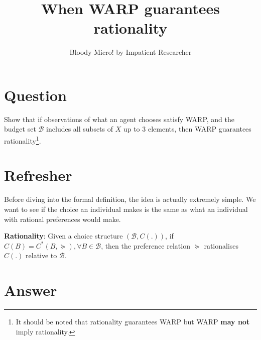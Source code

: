 \documentclass{tufte-handout}
\title{When WARP guarantees rationality}
\author{Bloody Micro! by Impatient Researcher}
\begin{document}
\maketitle%


\section{Question}\label{sec:question}

Show that if observations of what an agent chooses satisfy WARP, and the budget set $\mathscr{B}$ includes all subsets of $X$ up to 3 elements, then WARP guarantees rationality\footnote{It should be noted that rationality guarantees WARP but WARP \textbf{may not} imply rationality.}.

\section{Refresher}\label{sec:refresher}

Before diving into the formal definition, the idea is actually extremely simple. We want to see if the choice an individual makes is the same as what an individual with rational preferences would make.

\bigskip

\noindent \textbf{Rationality}: Given a choice structure $\left( \mathscr{B}, C(.) \right)$, if $C(B) = C^{*}(B, \succcurlyeq), \forall B \in \mathscr{B}$, then the preference relation $\succcurlyeq$ rationalises $C(.)$ relative to $\mathscr{B}$.

\section{Answer}\label{sec:answer}
\end{document}
